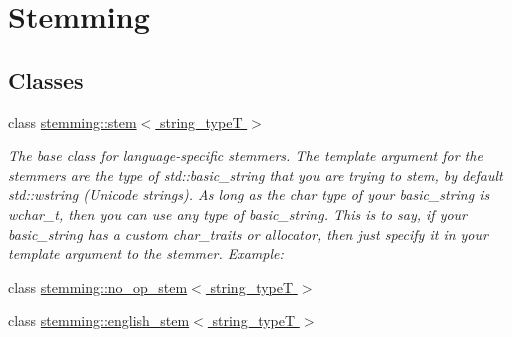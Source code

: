 \hypertarget{group___stemming}{\section{Stemming}
\label{group___stemming}
}
\subsection*{Classes}
\begin{DoxyCompactItemize}
\item 
class \hyperlink{classstemming_1_1stem}{stemming\-::stem$<$ string\-\_\-type\-T $>$}
\begin{DoxyCompactList}\small\item\em The base class for language-\/specific stemmers. The template argument for the stemmers are the type of std\-::basic\-\_\-string that you are trying to stem, by default std\-::wstring (Unicode strings). As long as the char type of your basic\-\_\-string is wchar\-\_\-t, then you can use any type of basic\-\_\-string. This is to say, if your basic\-\_\-string has a custom char\-\_\-traits or allocator, then just specify it in your template argument to the stemmer. Example\-: \end{DoxyCompactList}\item 
class \hyperlink{classstemming_1_1no__op__stem}{stemming\-::no\-\_\-op\-\_\-stem$<$ string\-\_\-type\-T $>$}
\item 
class \hyperlink{classstemming_1_1english__stem}{stemming\-::english\-\_\-stem$<$ string\-\_\-type\-T $>$}
\end{DoxyCompactItemize}
